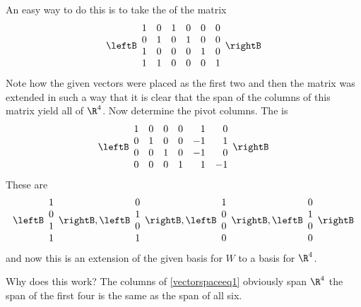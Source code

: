 \begin{solution}
An easy way to do this is to take the {\rref} of the matrix 
\begin{equation}
\leftB 
\begin{array}{cccccc}
1 & 0 & 1 & 0 & 0 & 0 \\ 
0 & 1 & 0 & 1 & 0 & 0 \\ 
1 & 0 & 0 & 0 & 1 & 0 \\ 
1 & 1 & 0 & 0 & 0 & 1
\end{array}
\rightB  \label{vectorspaceeq1}
\end{equation}
Note how the given vectors were placed as the first two and then the matrix
was extended in such a way that it is clear that the span of the columns of
this matrix yield all of $\R^{4}$. Now determine the pivot columns.
The {\rref} is 
\begin{equation}
\leftB 
\begin{array}{rrrrrr}
1 & 0 & 0 & 0 & 1 & 0 \\ 
0 & 1 & 0 & 0 & -1 & 1 \\ 
0 & 0 & 1 & 0 & -1 & 0 \\ 
0 & 0 & 0 & 1 & 1 & -1
\end{array}
\rightB  \label{vectorspaceeq2}
\end{equation}
These are 
\begin{equation*}
\leftB 
\begin{array}{c}
1 \\ 
0 \\ 
1 \\ 
1
\end{array}
\rightB ,\leftB 
\begin{array}{c}
0 \\ 
1 \\ 
0 \\ 
1
\end{array}
\rightB ,\leftB 
\begin{array}{c}
1 \\ 
0 \\ 
0 \\ 
0
\end{array}
\rightB ,\leftB 
\begin{array}{c}
0 \\ 
1 \\ 
0 \\ 
0
\end{array}
\rightB
\end{equation*}
and now this is an extension of the given basis for $W$ to a basis for $
\R^{4}$.

Why does this work? The columns of \ref{vectorspaceeq1} obviously span $\R
^{4}$  the span of the first four is the same as the span of all
six.
\end{solution}
